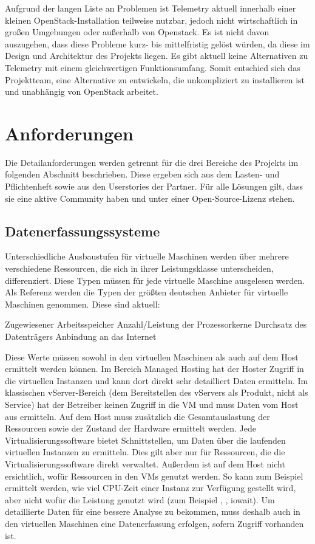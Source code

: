 Aufgrund der langen Liste an Problemen ist Telemetry aktuell innerhalb einer
kleinen OpenStack\hyp{}Installation teilweise nutzbar, jedoch nicht
wirtschaftlich in großen Umgebungen oder außerhalb von Openstack. Es ist nicht
davon auszugehen, dass diese Probleme kurz- bis mittelfristig gelöst würden, da
diese im Design und Architektur des Projekts liegen. Es gibt aktuell keine
Alternativen zu Telemetry mit einem gleichwertigen Funktionsumfang. Somit
entschied sich das Projektteam, eine Alternative zu entwickeln, die
unkompliziert zu installieren ist und unabhängig von OpenStack arbeitet.
\tm%

\section{Anforderungen}
\label{section:anforderungen}
Die Detailanforderungen werden getrennt für die drei Bereiche des Projekts im
folgenden Abschnitt beschrieben. Diese ergeben sich aus dem Lasten- und
Pflichtenheft sowie aus den Userstories der Partner. Für alle Lösungen gilt,
dass sie eine aktive Community haben und unter einer
Open\hyp{}Source\hyp{}Lizenz stehen.
\tm%

\subsection{Datenerfassungssysteme}
\label{section:datenerfassungssysteme}
Unterschiedliche Ausbaustufen für virtuelle Maschinen werden über mehrere
verschiedene Ressourcen, die sich in ihrer Leistungsklasse unterscheiden,
differenziert. Diese Typen müssen für jede virtuelle Maschine ausgelesen
werden. Als Referenz werden die Typen der größten deutschen Anbieter für
virtuelle Maschinen genommen. Diese sind aktuell:

\begin{outline}
  \1 Zugewiesener Arbeitsspeicher
  \1 Anzahl/Leistung der Prozessorkerne
  \1 Durchsatz des Datenträgers
  \1 Anbindung an das Internet
\end{outline}

Diese Werte müssen sowohl in den virtuellen Maschinen als auch auf dem Host
ermittelt werden können. Im Bereich Managed Hosting hat der Hoster Zugriff in
die virtuellen Instanzen und kann dort direkt sehr detailliert Daten ermitteln.
Im klassischen vServer\hyp{}Bereich (dem Bereitstellen des vServers als
Produkt, nicht als Service) hat der Betreiber keinen Zugriff in die VM und muss
Daten vom Host aus ermitteln. Auf dem Host muss zusätzlich die Gesamtauslastung
der Ressourcen sowie der Zustand der Hardware ermittelt werden. Jede
Virtualisierungssoftware bietet Schnittstellen, um Daten über die laufenden
virtuellen Instanzen zu ermitteln. Dies gilt aber nur für Ressourcen, die die
Virtualisierungssoftware direkt verwaltet. Außerdem ist auf dem Host nicht
ersichtlich, wofür Ressourcen in den VMs genutzt werden. So kann zum Beispiel
ermittelt werden, wie viel CPU\hyp{}Zeit einer Instanz zur Verfügung gestellt
wird, aber nicht wofür die Leistung genutzt wird (zum
Beispiel , ,
\gls{iowait}). Um detaillierte Daten für eine bessere Analyse zu bekommen, muss
deshalb auch in den virtuellen Maschinen eine Datenerfassung erfolgen, sofern
Zugriff vorhanden ist.

